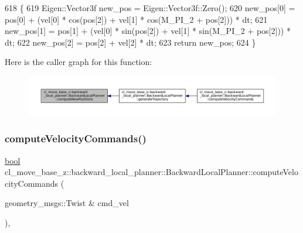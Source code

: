\begin{DoxyCode}
618         \{
619             Eigen::Vector3f new\_pos = Eigen::Vector3f::Zero();
620             new\_pos[0] = pos[0] + (vel[0] * cos(pos[2]) + vel[1] * cos(M\_PI\_2 + pos[2])) * dt;
621             new\_pos[1] = pos[1] + (vel[0] * sin(pos[2]) + vel[1] * sin(M\_PI\_2 + pos[2])) * dt;
622             new\_pos[2] = pos[2] + vel[2] * dt;
623             \textcolor{keywordflow}{return} new\_pos;
624         \}
\end{DoxyCode}
Here is the caller graph for this function\+:
\nopagebreak
\begin{figure}[H]
\begin{center}
\leavevmode
\includegraphics[width=350pt]{classcl__move__base__z_1_1backward__local__planner_1_1BackwardLocalPlanner_a0fe2ebd23fd79e8b574127e819ef0e14_icgraph}
\end{center}
\end{figure}
\mbox{\label{classcl__move__base__z_1_1backward__local__planner_1_1BackwardLocalPlanner_a25437208766366ca22f967fe72e80988}} 
\subsubsection{\texorpdfstring{compute\+Velocity\+Commands()}{computeVelocityCommands()}}
{\footnotesize\ttfamily \hyperlink{classbool}{bool} cl\+\_\+move\+\_\+base\+\_\+z\+::backward\+\_\+local\+\_\+planner\+::\+Backward\+Local\+Planner\+::compute\+Velocity\+Commands (\begin{DoxyParamCaption}\item[{geometry\+\_\+msgs\+::\+Twist \&}]{cmd\+\_\+vel }\end{DoxyParamCaption})\hspace{0.3cm}{\ttfamily [override]}, {\ttfamily [virtual]}}



